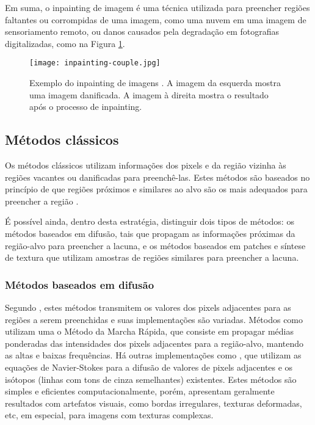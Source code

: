 Em suma, o inpainting de imagem é uma técnica utilizada para preencher regiões faltantes ou corrompidas de uma imagem, como uma nuvem em uma imagem de sensoriamento remoto, ou danos causados pela degradação em fotografias digitalizadas, como na Figura \ref{fig:inpainting-couple}.

\begin{figure}[ht]
\centering
\texttt{[image: inpainting-couple.jpg]}
\caption{Exemplo do inpainting de imagens \cite{wiki:inpainting-couple}. A imagem da esquerda mostra uma imagem danificada. A imagem à direita mostra o resultado após o processo de inpainting.}
\label{fig:inpainting-couple}
\end{figure}


\subsection{Métodos clássicos} \label{patch}
Os métodos clássicos utilizam informações dos pixels e da região vizinha às regiões  vacantes ou danificadas para preenchê-las. Estes métodos são baseados no princípio de que regiões próximos e similares ao alvo são os mais adequados para preencher a região \cite{patchmatch2009, Bertalmio2001navier}.

É possível ainda, dentro desta estratégia, distinguir dois tipos de métodos: os métodos baseados em difusão, tais que propagam as informações próximas da região-alvo para preencher a lacuna, e os métodos baseados em patches e síntese de textura que utilizam amostras de regiões similares para preencher a lacuna.

\subsubsection{Métodos baseados em difusão} \label{diffusion}
Segundo \cite{black2020evaluation}, estes métodos transmitem os valores dos pixels adjacentes para as regiões a serem preenchidas e suas implementações são variadas. Métodos como \cite{Telea2004} utilizam uma o Método da Marcha Rápida, que consiste em propagar médias ponderadas das intensidades dos pixels adjacentes para a região-alvo, mantendo as altas e baixas frequências. Há outras implementações como \cite{Bertalmio2001navier}, que utilizam as equações de Navier-Stokes para a difusão de valores de pixels adjacentes e os isótopos (linhas com tons de cinza semelhantes) existentes. Estes métodos são simples e eficientes computacionalmente, porém, apresentam geralmente resultados com artefatos visuais, como bordas irregulares, texturas deformadas, etc, em especial, para imagens com texturas complexas.


